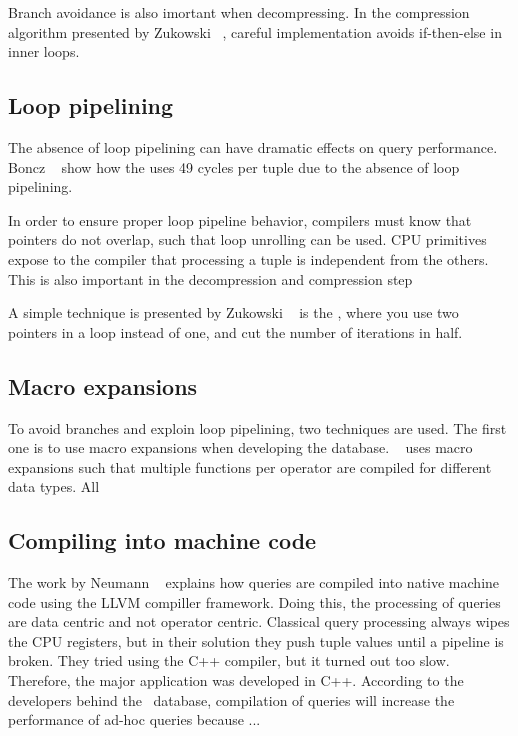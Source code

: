 Branch avoidance is also imortant when decompressing. In the compression algorithm presented by Zukowski \ea~\cite{Zukowski2006-oz}, careful implementation avoids if-then-else in inner loops.

\subsection{Loop pipelining}
\label{sub:Loop pipelining}
The absence of loop pipelining can have dramatic effects on query performance. Boncz \ea~\cite{Boncz2005-wj} show how the \mysql uses 49 cycles per tuple due to the absence of loop pipelining.

In order to ensure proper loop pipeline behavior, compilers must know that pointers do not overlap, such that loop unrolling can be used. CPU primitives expose to the compiler that processing a tuple is independent from the others. This is also important in the decompression and compression step \cite{Zukowski2006-oz}

A simple technique is presented by Zukowski \ea~\cite{Zukowski2006-oz} is the , where you use two pointers in a loop instead of one, and cut the number of iterations in half.

\subsection{Macro expansions}
\label{sub:Macro expansions}
To avoid branches and exploin loop pipelining, two techniques are used. The first one is to use macro expansions when developing the database. \monetdb~\cite{Boncz2002-yj} uses macro expansions such that multiple functions per operator are compiled for different data types. All

\subsection{Compiling into machine code}
\label{sub:Compiling into machine code}
The work by Neumann \ea~\cite{Neumann2011-uq} explains how queries are compiled into native machine code using the LLVM compiller framework. Doing this, the processing of queries are data centric and not operator centric. Classical query processing always wipes the CPU registers, but in their solution they push tuple values until a pipeline is broken. They tried using the C++ compiler, but it turned out too slow. Therefore, the major application was developed in C++. According to the developers behind the \hyper~database, compilation of queries will increase the performance of ad-hoc queries because ...

